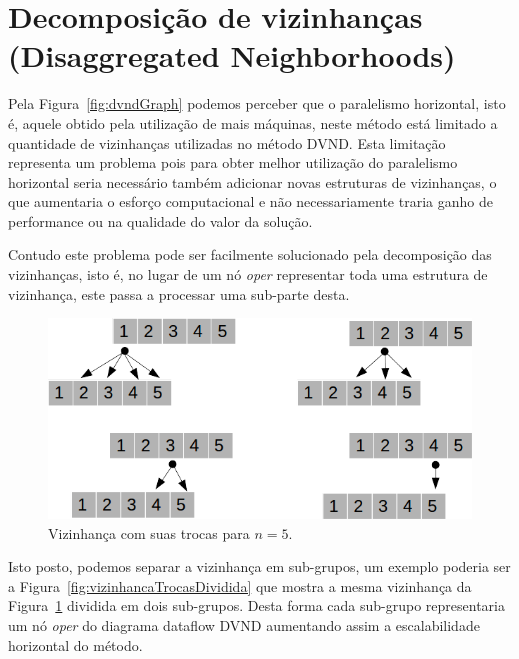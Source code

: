 \section{Decomposição de vizinhanças (Disaggregated Neighborhoods)} \label{subsec:metodologiaDecomposicaoVizinhancas}

Pela Figura~\ref{fig:dvndGraph} podemos perceber que o paralelismo horizontal, isto é, aquele obtido pela utilização de mais máquinas, neste método está limitado a quantidade de vizinhanças utilizadas no método DVND.
Esta limitação representa um problema pois para obter melhor utilização do paralelismo horizontal seria necessário também adicionar novas estruturas de vizinhanças, o que aumentaria o esforço computacional e não necessariamente traria ganho de performance ou na qualidade do valor da solução.

Contudo este problema pode ser facilmente solucionado pela decomposição das vizinhanças, isto é, no lugar de um nó \textit{oper} representar toda uma estrutura de vizinhança, este passa a processar uma sub-parte desta.

\begin{figure}[htbp]
    \centerline{\includegraphics[scale=0.6]{figuras/vizinhanca.png}}
    \caption{Vizinhança com suas trocas para $n=5$.}
    \label{fig:vizinhancaTrocas}
\end{figure}

Isto posto, podemos separar a vizinhança em sub-grupos, um exemplo poderia ser a Figura~\ref{fig:vizinhancaTrocasDividida} que mostra a mesma vizinhança da Figura~\ref{fig:vizinhancaTrocas} dividida em dois sub-grupos. Desta forma cada sub-grupo representaria um nó \textit{oper} do diagrama dataflow DVND aumentando assim a escalabilidade horizontal do método.

